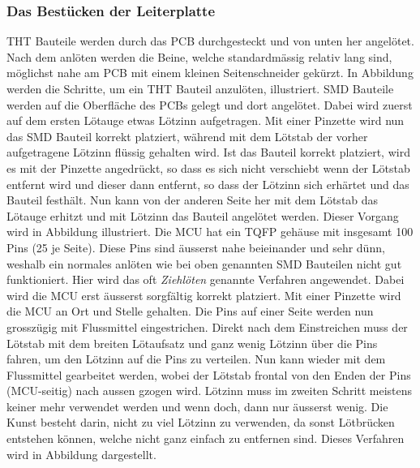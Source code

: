 \subsubsection{Das Bestücken der Leiterplatte}
THT Bauteile werden durch das PCB durchgesteckt und von unten her angelötet. Nach dem anlöten werden die Beine, welche standardmässig relativ lang sind, möglichst nahe am PCB mit einem kleinen Seitenschneider gekürzt. In Abbildung  werden die Schritte, um ein THT Bauteil anzulöten, illustriert.
SMD Bauteile werden auf die Oberfläche des PCBs gelegt und dort angelötet. Dabei wird zuerst auf dem ersten Lötauge etwas Lötzinn aufgetragen. Mit einer Pinzette wird nun das SMD Bauteil korrekt platziert, während mit dem Lötstab der vorher aufgetragene Lötzinn flüssig gehalten wird. Ist das Bauteil korrekt platziert, wird es mit der Pinzette angedrückt, so dass es sich nicht verschiebt wenn der Lötstab entfernt wird und dieser dann entfernt, so dass der Lötzinn sich erhärtet und das Bauteil festhält. Nun kann von der anderen Seite her mit dem Lötstab das Lötauge erhitzt und mit Lötzinn das Bauteil angelötet werden. Dieser Vorgang wird in Abbildung  illustriert.
Die MCU hat ein TQFP gehäuse mit insgesamt 100 Pins (25 je Seite). Diese Pins sind äusserst nahe beieinander und sehr dünn, weshalb ein normales anlöten wie bei oben genannten SMD Bauteilen nicht gut funktioniert. Hier wird das oft \textit{Ziehlöten} genannte Verfahren angewendet. Dabei wird die MCU erst äusserst sorgfältig korrekt platziert. Mit einer Pinzette wird die MCU an Ort und Stelle gehalten. Die Pins auf einer Seite werden nun grosszügig mit Flussmittel eingestrichen. Direkt nach dem Einstreichen muss der Lötstab mit dem breiten Lötaufsatz und ganz wenig Lötzinn über die Pins fahren, um den Lötzinn auf die Pins zu verteilen. Nun kann wieder mit dem Flussmittel gearbeitet werden, wobei der Lötstab frontal von den Enden der Pins (MCU-seitig) nach aussen gzogen wird. Lötzinn muss im zweiten Schritt meistens keiner mehr verwendet werden und wenn doch, dann nur äusserst wenig. Die Kunst besteht darin, nicht zu viel Lötzinn zu verwenden, da sonst Lötbrücken entstehen können, welche nicht ganz einfach zu entfernen sind. Dieses Verfahren wird in Abbildung  dargestellt.

